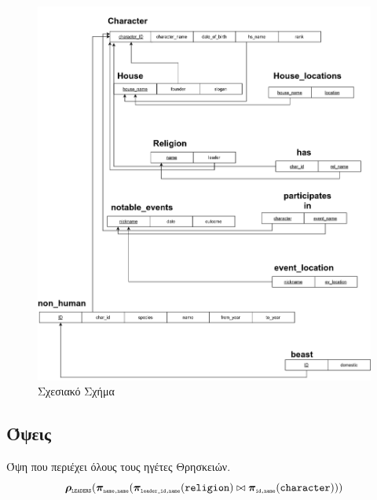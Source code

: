 \documentclass[../main.tex]{subfiles}
\begin{document}
\begin{figure}[H]
	\includegraphics[width=\textwidth]{../images/relation_diagram.png}
	\caption{Σχεσιακό Σχήμα}
\end{figure}

\subsection{Όψεις}

\newcommand{\tsub}[1]{\texttt{\tiny#1}}

Όψη που περιέχει όλους τους ηγέτες Θρησκειών.
\begin{equation}
	\bm{\rho}_{\tsub{LEADERS}}
	(
	\bm{\pi}_{\tsub{name,name}} (
	\bm{\pi}_{\tsub{leader\_id,name}}(\texttt{religion})
	\bowtie
	\bm{\pi}_{\tsub{id,name}}(\texttt{character})
	))
\end{equation}
\end{document}
